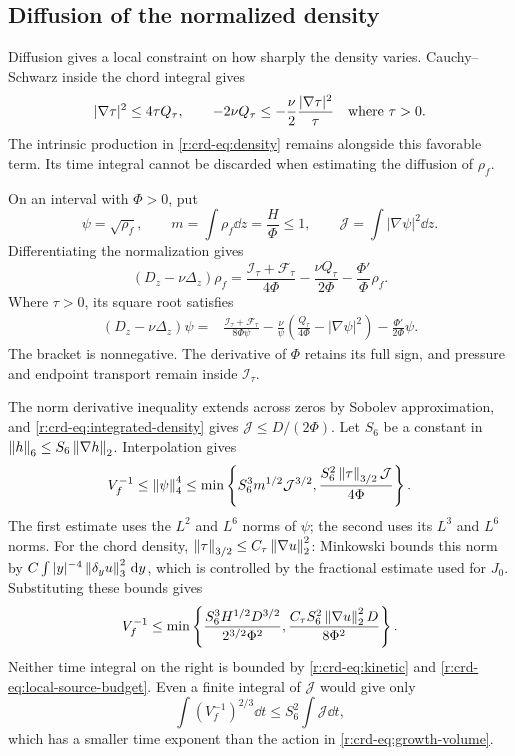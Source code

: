 \subsection{Diffusion of the normalized density}

Diffusion gives a local constraint on how sharply the density varies.
Cauchy--Schwarz inside the chord integral gives
\[
 |\nabla\tau|^2\le4\tau Q_\tau,\qquad
 -2\nu Q_\tau\le-\frac\nu2\frac{|\nabla\tau|^2}{\tau}
 \quad\hbox{where }\tau>0.
\]
The intrinsic production in \eqref{r:crd-eq:density} remains alongside
this favorable term. Its time integral cannot be discarded when estimating
the diffusion of \(\rho_f\).

On an interval with \(\Phi>0\), put
\[
 \psi=\sqrt{\rho_f},\qquad
 m=\int\rho_f\dd z=\frac H\Phi\le1,\qquad
 \mathcal J=\int|\nabla\psi|^2\dd z.
\]
Differentiating the normalization gives
\begin{equation}
 (D_z-\nu\Delta_z)\rho_f
 =\frac{\mathcal I_\tau+\mathcal F_\tau}{4\Phi}
 -\frac{\nu Q_\tau}{2\Phi}
 -\frac{\Phi'}{\Phi}\rho_f.
 \label{r:crd-eq:normalized-density}
\end{equation}
Where \(\tau>0\), its square root satisfies
\begin{equation}
 \begin{aligned}
 (D_z-\nu\Delta_z)\psi
 ={}&\frac{\mathcal I_\tau+\mathcal F_\tau}{8\Phi\psi}
 -\frac{\nu}{\psi}
     \left(\frac{Q_\tau}{4\Phi}-|\nabla\psi|^2\right)
 -\frac{\Phi'}{2\Phi}\psi.
 \end{aligned}
 \label{r:crd-eq:square-root}
\end{equation}
The bracket is nonnegative. The derivative of \(\Phi\) retains its full
sign, and pressure and endpoint transport remain inside \(\mathcal I_\tau\).

The norm derivative inequality extends across zeros by Sobolev approximation,
and \eqref{r:crd-eq:integrated-density} gives
\(\mathcal J\le D/(2\Phi)\).
Let \(S_6\) be a constant in
\(\left\lVert h\right\rVert_6\le S_6\left\lVert \nabla h\right\rVert_2\). Interpolation gives
\begin{equation}
 V_f^{-1}\le\left\lVert \psi\right\rVert_4^4
 \le\min\left\{
 S_6^3m^{1/2}\mathcal J^{3/2},
 \frac{S_6^2\left\lVert \tau\right\rVert_{3/2}\mathcal J}{4\Phi}
 \right\}.
 \label{r:crd-eq:density-interpolation}
\end{equation}
The first estimate uses the \(L^2\) and \(L^6\) norms of \(\psi\);
the second uses its \(L^3\) and \(L^6\) norms.
For the chord density,
\(\left\lVert \tau\right\rVert_{3/2}\le C_\tau\left\lVert \nabla u\right\rVert_2^2\):
Minkowski bounds this norm by
\(C\int |y|^{-4}\left\lVert \delta_yu\right\rVert_3^2\,\mathrm d y\), which is controlled by
the fractional estimate used for \(J_0\).
Substituting these bounds gives
\begin{equation}
 V_f^{-1}\le\min\left\{
 \frac{S_6^3H^{1/2}D^{3/2}}{2^{3/2}\Phi^2},
 \frac{C_\tau S_6^2\left\lVert \nabla u\right\rVert_2^2D}{8\Phi^2}
 \right\}.
 \label{r:crd-eq:inverse-volume}
\end{equation}
Neither time integral on the right is bounded by
\eqref{r:crd-eq:kinetic} and \eqref{r:crd-eq:local-source-budget}.
Even a finite integral of \(\mathcal J\) would give only
\[
 \int(V_f^{-1})^{2/3}\dd t\le S_6^2\int\mathcal J\dd t,
\]
which has a smaller time exponent than the action in
\eqref{r:crd-eq:growth-volume}.


